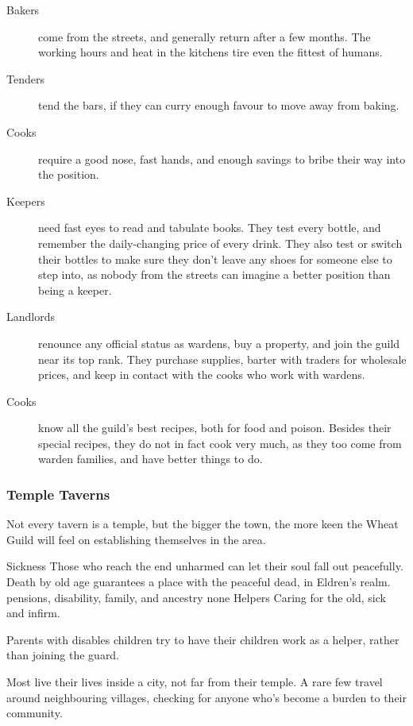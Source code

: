 \begin{multicols}{2}
\begin{description}
  \item[Bakers]
  come from the streets, and generally return after a few months.
  The working hours and heat in the kitchens tire even the fittest of humans.
  \item[Tenders]
  tend the bars, if they can curry enough favour to move away from baking.
  \item[Cooks]
  require a good nose, fast hands, and enough savings to bribe their way into the position.
  \item[Keepers]
  need fast eyes to read and tabulate books.
  They test every bottle, and remember the daily-changing price of every drink.
  They also test or switch their bottles to make sure they don't leave any shoes for someone else to step into, as nobody from the streets can imagine a better position than being a keeper.
  \item[Landlords]
  renounce any official status as wardens, buy a property, and join the guild near its top rank.
  They purchase supplies, barter with traders for wholesale prices, and keep in contact with the cooks who work with wardens.
  \item[Cooks]
  know all the guild's best recipes, both for food and poison.
  Besides their special recipes, they do not in fact cook very much, as they too come from warden families, and have better things to do.
\end{description}

\subsubsection{Temple Taverns}

Not every tavern is a temple, but the bigger the town, the more keen the Wheat Guild will feel on establishing themselves in the area.

  {Sickness}%
  {
    Those who reach the end unharmed can let their soul fall out peacefully.
    Death by old age guarantees a place with the peaceful dead, in Eldren's realm.
  }%
  {pensions, disability, family, and ancestry}%
  {none}%
  {Helpers}%
  {
    Caring for the old, sick and infirm.
  }%

Parents with disables children try to have their children work as a helper, rather than joining the \gls{guard}.

Most live their lives inside a city, not far from their temple.
A rare few travel around neighbouring villages, checking for anyone who's become a burden to their community.


\end{multicols}
